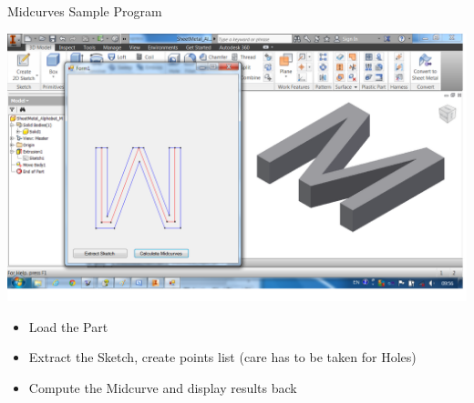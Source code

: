 \begin{frame}{Midcurves Sample Program}

\includegraphics[width=0.9\linewidth]{../Common/images/ImplMidcurvesProgram.png}
\begin{itemize}
\item Load the Part
\item Extract the Sketch, create points list (care has to be taken for Holes)
\item Compute the Midcurve and display results back
\end{itemize}

\end{frame}
